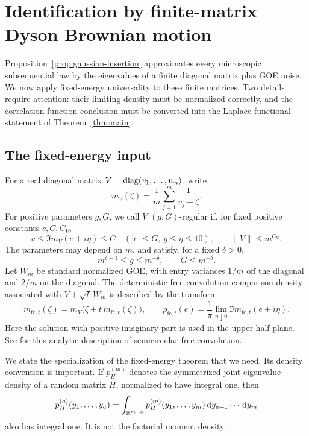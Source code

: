 \section{Identification by finite-matrix Dyson Brownian motion}
\label{sec:dbm}

Proposition~\ref{prop:gaussian-insertion} approximates every microscopic
subsequential law by the eigenvalues of a finite diagonal matrix plus GOE
noise. We now apply fixed-energy universality to these finite matrices.
Two details require attention: their limiting density must be normalized
correctly, and the correlation-function conclusion must be converted into
the Laplace-functional statement of Theorem~\ref{thm:main}.

\subsection{The fixed-energy input}

For a real diagonal matrix \(V=\operatorname{diag}(v_1,\ldots,v_m)\), write
\[
 m_V(\zeta)=\frac1m\sum_{j=1}^m\frac1{v_j-\zeta}.
\]
For positive parameters \(g,G\), we call \(V\) \((g,G)\)-regular
if, for fixed positive constants
\(c,C,C_V\),
\begin{equation}
 \label{eq:dbm-regularity}
 c\le \Im m_V(e+i\eta)\le C
 \quad (|e|\le G,\ g\le\eta\le10),
 \qquad \|V\|\le m^{C_V}.
\end{equation}
The parameters may depend on \(m\), and satisfy, for a fixed
\(\delta>0\),
\begin{equation}
 \label{eq:dbm-parameter-domain}
 m^{\delta-1}\le g\le m^{-\delta},
 \qquad G\le m^{-\delta}.
\end{equation}
Let \(W_m\) be standard normalized GOE, with entry variances \(1/m\)
off the diagonal and \(2/m\) on the diagonal. The deterministic
free-convolution comparison density associated with
\(V+\sqrt t\,W_m\) is described by the transform
\begin{equation}
 \label{eq:dbm-free-convolution}
 m_{\mathrm{fc},t}(\zeta)
   =m_V\bigl(\zeta+t\,m_{\mathrm{fc},t}(\zeta)\bigr),
 \qquad
 \rho_{\mathrm{fc},t}(e)
   =\frac1\pi\lim_{\eta\downarrow0}
          \Im m_{\mathrm{fc},t}(e+i\eta).
\end{equation}
Here the solution with positive imaginary part is used in the upper
half-plane. See \citet[Lemma~4, Proposition~2, and Corollary~2]{Biane} for this analytic
description of semicircular free convolution.

We state the specialization of the fixed-energy theorem that we need.
Its density convention is important. If \(p_H^{(m)}\) denotes the
symmetrized joint eigenvalue density of a random matrix \(H\), normalized
to have integral one, then
\[
 p_H^{(a)}(y_1,\ldots,y_a)
   =\int_{\mathbb R^{m-a}}p_H^{(m)}(y_1,\ldots,y_m)
        \,\mathrm d y_{a+1}\cdots\,\mathrm d y_m
\]
also has integral one. It is not the factorial moment density.

